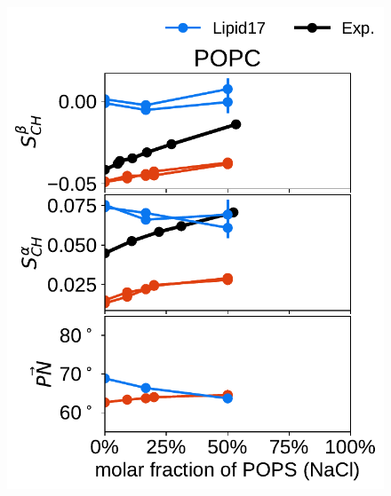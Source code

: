 \documentclass[journal=jpcbfk,manuscript=article]{achemso}
\newlength{\figheightsmall}
\newlength{\figheight}
\begin{document}
\begin{figure}[!tbp] 
  \centering 
  \includegraphics[height=\figheightsmall]{../Fig/order_parameters_changes_A-B_PC-PS_mix_POPC_nacl.pdf} 

\end{figure}
\end{document}
